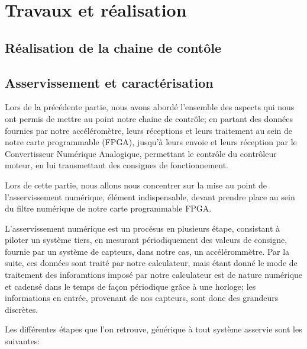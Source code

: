 \documentclass[french,a4paper,12pt]{report}
\begin{document}
	
	\part{Travaux et réalisation}	
	
	\chapter{Réalisation de la chaine de contôle}
	
	
	
	
	\chapter{Asservissement et caractérisation}
	
	Lors de la précédente partie, nous avons abordé l'ensemble des aspects qui nous ont permis de mettre au point notre chaine de contrôle; en partant des données fournies par notre accéléromètre, leurs réceptions et leurs traitement au sein de notre carte programmable (FPGA), jusqu'à leurs envoie et leurs réception par le Convertisseur Numérique Analogique, permettant le contrôle du contrôleur moteur, en lui transmettant des consignes de fonctionnement.
	
	Lors de cette partie, nous allons nous concentrer sur la mise au point de l'asservissement numérique, élément indispensable, devant prendre place au sein du filtre numérique de notre carte programmable FPGA.
	
	L'asservissement numérique est un procésus en plusieurs étape, consistant à piloter un système tiers, en mesurant périodiquement des valeurs de consigne, fournie par un système de capteurs, dans notre cas, un accélérommètre. 
	Par la suite, ces données sont traité par notre calculateur, mais étant donné le mode de traitement des inforamtions imposé par notre calculateur est de nature numérique et cadensé dans le temps de façon périodique grâce à une horloge; les informations en entrée, provenant de nos capteurs, sont donc des grandeurs discrètes.
	
	Les différentes étapes que l'on retrouve,  générique à tout système asservie sont les suivantes:
	
\end{document}

